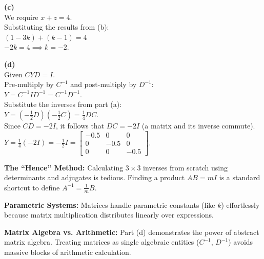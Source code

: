 \begin{solution}
\medskip
\textbf{(c)} \\
We require $x + z = 4$. \\
Substituting the results from (b): \\
$(1 - 3k) + (k - 1) = 4$ \\
$-2k = 4 \implies k = -2$.

\medskip
\textbf{(d)} \\
Given $CYD = I$. \\
Pre-multiply by $C^{-1}$ and post-multiply by $D^{-1}$: \\
$Y = C^{-1} I D^{-1} = C^{-1} D^{-1}$. \\
Substitute the inverses from part (a): \\
$Y = \left(-\frac{1}{2}D\right)\left(-\frac{1}{2}C\right) = \frac{1}{4}DC$. \\
Since $CD = -2I$, it follows that $DC = -2I$ (a matrix and its inverse commute). \\
$Y = \frac{1}{4}(-2I) = -\frac{1}{2}I = \begin{bmatrix} -0.5 & 0 & 0 \\ 0 & -0.5 & 0 \\ 0 & 0 & -0.5 \end{bmatrix}$.
\end{solution}

\begin{takeaways}
\item \textbf{The ``Hence'' Method:} Calculating $3 \times 3$ inverses from scratch using determinants and adjugates is tedious. Finding a product $AB = mI$ is a standard shortcut to define $A^{-1} = \frac{1}{m}B$.
\item \textbf{Parametric Systems:} Matrices handle parametric constants (like $k$) effortlessly because matrix multiplication distributes linearly over expressions.
\item \textbf{Matrix Algebra vs. Arithmetic:} Part (d) demonstrates the power of abstract matrix algebra. Treating matrices as single algebraic entities ($C^{-1}$, $D^{-1}$) avoids massive blocks of arithmetic calculation.
\end{takeaways}


